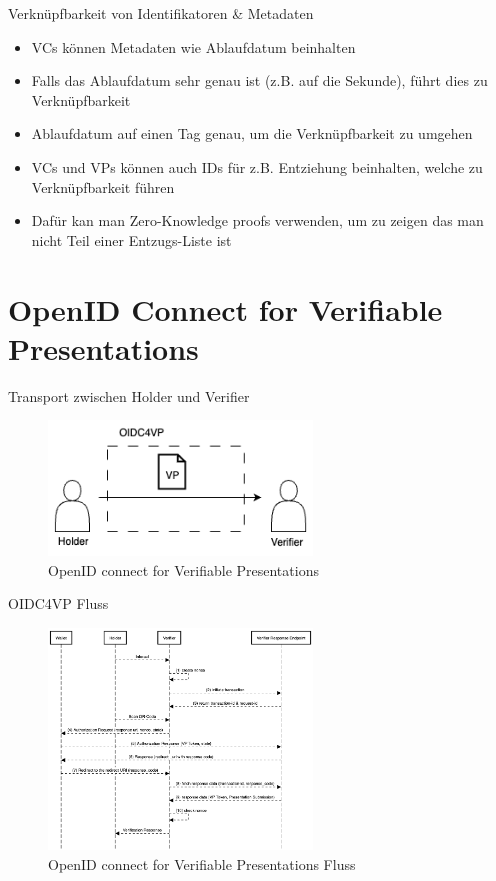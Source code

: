\documentclass[
	german,%
	authorontitle=true,
	]{bfhbeamer}
\begin{document}
\begin{frame}{Verknüpfbarkeit von Identifikatoren \& Metadaten}
    \begin{itemize}
        \item VCs können Metadaten wie Ablaufdatum beinhalten
        \item Falls das Ablaufdatum sehr genau ist (z.B. auf die Sekunde), führt dies zu Verknüpfbarkeit
        \item Ablaufdatum auf einen Tag genau, um die Verknüpfbarkeit zu umgehen
        \item VCs und VPs können auch IDs für z.B. Entziehung beinhalten, welche zu Verknüpfbarkeit führen
        \item Dafür kan man Zero-Knowledge proofs verwenden, um zu zeigen das man nicht Teil einer Entzugs-Liste ist
    \end{itemize}
\end{frame}

\section{OpenID Connect for Verifiable Presentations}

\begin{frame}{Transport zwischen Holder und Verifier}
    \begin{figure}
        \centering
        \includegraphics[width=70mm]{../img/OIDC4VP.png}
        \caption{OpenID connect for Verifiable Presentations}
    \end{figure}
\end{frame}

\begin{frame}{OIDC4VP Fluss}
    \begin{figure}
        \centering
        \includegraphics[width=70mm]{../img/OIDC4VPFlow.png}
        \caption{OpenID connect for Verifiable Presentations Fluss}
    \end{figure}
\end{frame}
\end{document}
